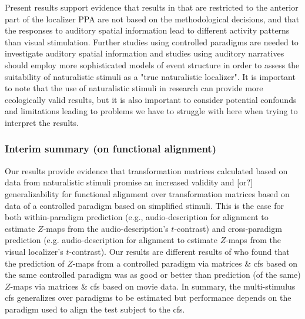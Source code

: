 %
Present results support evidence that results in \citet{haeusler2022processing}
that are restricted to the anterior part of the localizer PPA are not based on
the methodological decisions, and that the responses to auditory spatial
information lead to different activity patterns than visual stimulation.
%
Further studies using controlled paradigms are needed to investigate auditory
spatial information and studies using auditory narratives should employ more
sophisticated models of event structure in order to assess the suitability of
naturalistic stimuli as a "true naturalistic localizer".
%
It is important to note that the use of naturalistic stimuli in research can
provide more ecologically valid results, but it is also important to consider
potential confounds and limitations leading to problems we have to struggle with
here when trying to interpret the results.




\subsubsection{Interim summary (on functional alignment)}




%
Our results provide evidence that transformation matrices calculated based on
data from naturalistic stimuli promise an increased validity and [or?]
generalizability for functional alignment over transformation matrices based on
data of a controlled paradigm based on simplified stimuli.
%
This is the case for both within-paradigm prediction (e.g., audio-description
for alignment to estimate $Z$-maps from the audio-description's $t$-contrast)
and cross-paradigm prediction (e.g. audio-description for alignment to estimate
$Z$-maps from the visual localizer's $t$-contrast).
%
Our results are different results of \citet{haxby2011common} who found that the
prediction of $Z$-maps from a controlled paradigm via matrices \& \ac{cfs} based
on the same controlled paradigm was as good or better than prediction (of the
same) $Z$-maps via matrices \& \ac{cfs} based on movie data.
%
In summary, the multi-stimulus \ac{cfs} generalizes over paradigms to be
estimated but performance depends on the paradigm used to align the test subject
to the \ac{cfs}.



